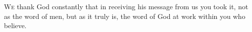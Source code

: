 
\lettrine{W}{e} thank God constantly that in receiving his message from us you took it, not as the word of men, but as it truly is, the word of God at work within you who believe.